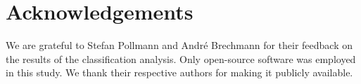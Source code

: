 \section*{Acknowledgements}

We are grateful to Stefan Pollmann and Andr\'e Brechmann for their feedback on
the results of the classification analysis.
%
Only open-source software was employed in this study. We thank their respective
authors for making it publicly available.

\newpage




